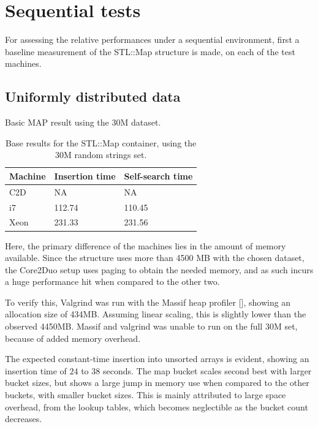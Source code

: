 \section{Sequential tests}
For assessing the relative performances under a sequential environment, first a
baseline measurement of the {\keyword STL::Map} structure is made, on each of
the test machines.

\subsection{Uniformly distributed data}
Basic MAP result using the 30M dataset.

\begin{table}[h!]
    \centering
    \begin{tabular}[here]{ l l l }
        \hline
        Machine   & Insertion time & Self-search time  \\\hline
        C2D       & NA             & NA                \\\hline
        i7        & 112.74         & 110.45            \\\hline
        Xeon      & 231.33         & 231.56            \\\hline 
    \end{tabular}
    \caption{Base results for the STL::Map container, using the 30M random strings set.}
    \label{tab:maptimes}
\end{table}

Here, the primary difference of the machines lies in the amount of memory
available. Since the structure uses more than 4500 MB with the chosen dataset,
the Core2Duo setup uses paging to obtain the needed memory, and as such incurs
a huge performance hit when compared to the other two.

To verify this, Valgrind was run with the Massif heap profiler
[\pageref{fig:Massif_map_30m}], showing an allocation size of 434MB. Assuming
linear scaling, this is slightly lower than the observed 4450MB. Massif and
valgrind was unable to run on the full 30M set, because of added memory
overhead.

The expected constant-time insertion into unsorted arrays is evident, showing
an insertion time of $24$ to $38$ seconds.
The {\keyword map} bucket scales second best with larger bucket sizes, but
shows a large jump in memory use when compared to the other buckets, with smaller
bucket sizes. This is mainly attributed to large space overhead, from the
lookup tables, which becomes neglectible as the bucket count decreases.

